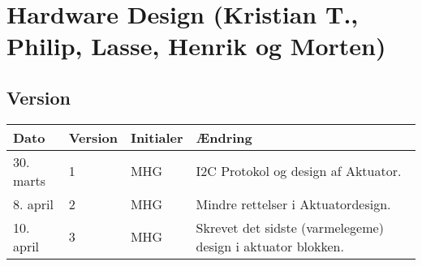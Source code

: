 
\chapter{Hardware Design \newline (Kristian T., Philip, Lasse, Henrik og Morten)}

\section{Version}
\begin{table}[h]
	\centering
	\begin{tabularx}{\textwidth - 2cm}{|l|l|l|X|}
	\hline
	Dato	& Version	& Initialer & Ændring	\\ \hline
	30. marts & 1 & MHG & I2C Protokol og design af Aktuator. \\ \hline
	8. april & 2 & MHG & Mindre rettelser i Aktuatordesign. \\ \hline
	10. april & 3 & MHG & Skrevet det sidste (varmelegeme) design i aktuator blokken. \\\hline 
	\end{tabularx}
\end{table}



